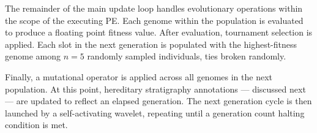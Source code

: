 The remainder of the main update loop handles evolutionary operations within the scope of the executing PE.
Each genome within the population is evaluated to produce a floating point fitness value.
After evaluation, tournament selection is applied.
Each slot in the next generation is populated with the highest-fitness genome among $n=5$ randomly sampled individuals, ties broken randomly.

Finally, a mutational operator is applied across all genomes in the next population.
At this point, hereditary stratigraphy annotations --- discussed next --- are updated to reflect an elapsed generation.
The next generation cycle is then launched by a self-activating wavelet, repeating until a generation count halting condition is met.




